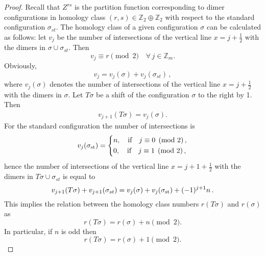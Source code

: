 \documentclass[12pt,reqno]{amsart}
\numberwithin{equation}{section}
\newcommand{\Z}{{\mathbb Z}}
\newcommand{\sg}{\sigma}
\begin{document}
\begin{proof}
Recall that $Z^{rs}$ is the partition function corresponding to dimer configurations in homology class $(r,s)\in \Z_2\oplus\Z_2$ with respect to the standard configuration $\sg_{st}$. The homology class of a given configuration $\sg$ can be calculated as follows:
let $v_j$ be the number of intersections of the vertical line $x=j+\frac{1}{2}$ with the dimers in $\sg\cup\sg_{st}$. Then 
\begin{equation}\label{rbij0}
v_j\equiv r\pmod 2 \quad \forall\,j\in\Z_m.
\end{equation}
Obviously,
\begin{equation}\label{rbij}
 v_j= v_j(\sg)+v_j(\sg_{st})\,,
\end{equation}
where $v_j(\sg)$ denotes the number of intersections of the vertical line $x=j+\frac{1}{2}$ with the dimers in $\sg$. Let $T\sg$ be a shift of the configuration $\sg$ to the right by 1. Then 
\begin{equation}\label{rbij1}
\begin{aligned}
v_{j+1}(T\sg)=v_j(\sg).
\end{aligned}
\end{equation}
For the standard configuration the number of intersections is
\begin{equation}\label{rbij2}
v_j(\sg_{\rm st})=
\left\{
\begin{aligned}
&n,\quad \textrm{if}\quad j\equiv 0\pmod 2\,,\\
&0,\quad \textrm{if}\quad j\equiv 1\pmod 2\,,
\end{aligned}
\right.
\end{equation}
hence  the number of intersections of the vertical line $x=j+1+\frac{1}{2}$ with the dimers in $T\sg\cup\sg_{st}$ is equal to  
\begin{equation}\label{rbij3}
  v_{j+1}(T\sg)+v_{j+1}(\sg_{st})=v_j(\sg)+v_j(\sg_{\rm st})+(-1)^{j+1}n\,.
\end{equation}
This implies the relation between the homology class numbers $r(T\sg)$ and $r(\sg)$ as
\begin{equation}\label{rbij4}
 r(T\sg)=r(\sg)+n \pmod 2.
\end{equation}
In particular, if $n$ is odd then
\begin{equation}\label{rbij5}
 r(T\sg)=r(\sg)+1 \pmod 2.
\end{equation}


\end{proof}
\end{document}
